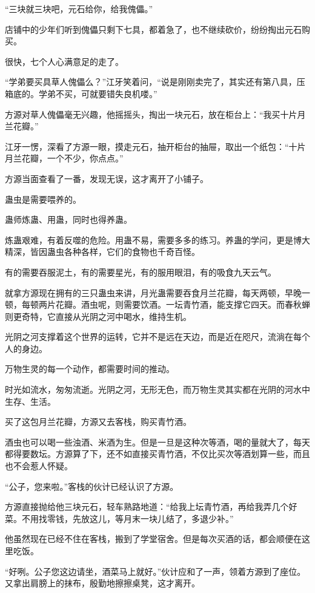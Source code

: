 \begin{this_body}
“三块就三块吧，元石给你，给我傀儡。”

店铺中的少年们听到傀儡只剩下七具，都着急了，也不继续砍价，纷纷掏出元石购买。

很快，七个人心满意足的走了。

“学弟要买具草人傀儡么？”江牙笑着问，“说是刚刚卖完了，其实还有第八具，压箱底的。学弟不买，可就要错失良机喽。”

方源对草人傀儡毫无兴趣，他摇摇头，掏出一块元石，放在柜台上：“我买十片月兰花瓣。”

江牙一愣，深看了方源一眼，摸走元石，抽开柜台的抽屉，取出一个纸包：“十片月兰花瓣，一个不少，你点点。”

方源当面查看了一番，发现无误，这才离开了小铺子。

蛊虫是需要喂养的。

蛊师炼蛊、用蛊，同时也得养蛊。

炼蛊艰难，有着反噬的危险。用蛊不易，需要多多的练习。养蛊的学问，更是博大精深，皆因蛊虫各种各样，它们的食物也千奇百怪。

有的需要吞服泥土，有的需要星光，有的服用眼泪，有的吸食九天云气。

就拿方源现在拥有的三只蛊虫来讲，月光蛊需要吞食月兰花瓣，每天两顿，早晚一顿，每顿两片花瓣。酒虫呢，则需要饮酒。一坛青竹酒，能支撑它四天。而春秋蝉则更奇特，它直接从光阴之河中喝水，维持生机。

光阴之河支撑着这个世界的运转，它并不是远在天边，而是近在咫尺，流淌在每个人的身边。

万物生灵的每一个动作，都需要时间的推动。

时光如流水，匆匆流逝。光阴之河，无形无色，而万物生灵其实都在光阴的河水中生存、生活。

买了这包月兰花瓣，方源又去客栈，购买青竹酒。

酒虫也可以喝一些浊酒、米酒为生。但是一旦是这种次等酒，喝的量就大了，每天都得要数坛。方源算了下，还不如直接买青竹酒，不仅比买次等酒划算一些，而且也不会惹人怀疑。

“公子，您来啦。”客栈的伙计已经认识了方源。

方源直接抛给他三块元石，轻车熟路地道：“给我上坛青竹酒，再给我弄几个好菜。不用找零钱，先放这儿，等月末一块儿结了，多退少补。”

他虽然现在已经不住在客栈，搬到了学堂宿舍。但是每次买酒的话，都会顺便在这里吃饭。

“好咧。公子您这边请坐，酒菜马上就好。”伙计应和了一声，领着方源到了座位。又拿出肩膀上的抹布，殷勤地擦擦桌凳，这才离开。


\end{this_body}
